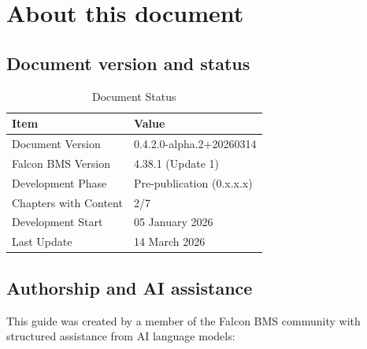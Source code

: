 \documentclass[11pt, a4paper, twoside]{report}
\newcommand{\docversion}{0.4.2.0-alpha.2}
\newcommand{\docbuild}{20260314}
\newcommand{\docstartdate}{05 January 2026}
\newcommand{\docenddate}{14 March 2026}
\newcommand{\chapterscompletedof}{2/7}
\newcommand{\fulldocversion}{\docversion+\docbuild}
\begin{document}
\section{About this document}
\label{sec:C1-S4}

\subsection{Document version and status}
\label{sec:C1-S4-S1}

\begin{table}[H]
	\centering
	\caption{Document Status}
	\label{tab:C1-doc-status}
	\small
	\renewcommand{\arraystretch}{1.25}
	\begin{tabular}{L{4.5cm} L{9.0cm}}
		\toprule
		\textbf{Item} & \textbf{Value} \\
		\midrule
		Document Version & \fulldocversion \\
		Falcon BMS Version & 4.38.1 (Update 1) \\
		Development Phase & Pre-publication (0.x.x.x) \\
		Chapters with Content & \chapterscompletedof \\
		Development Start & \docstartdate \\
		Last Update & \docenddate \\
		\bottomrule
	\end{tabular}
\end{table}

\subsection{Authorship and AI assistance}
\label{sec:C1-S4-S2}

This guide was created by a member of the Falcon BMS community with structured assistance from AI language models:
\end{document}
